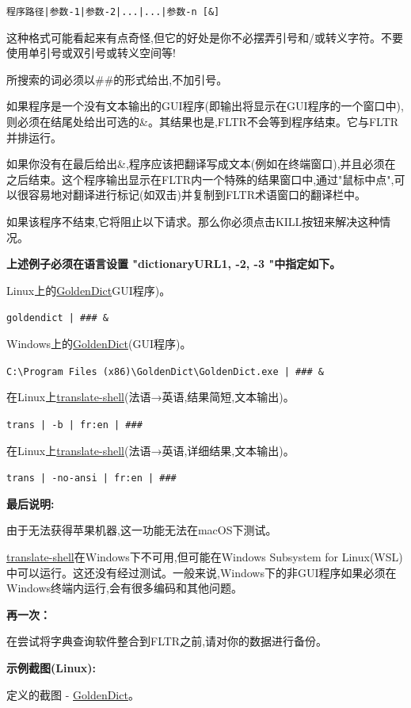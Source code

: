 \documentclass[cn,10pt,math=newtx,citestyle=gb7714-2015,bibstyle=gb7714-2015]{elegantbook}
\newcommand{\goldendict}{\href{http://goldendict.org/}{GoldenDict}}
\newcommand{\translateshell}{\href{https://github.com/soimort/translate-shell}{translate-shell}}
\begin{document}
\lstinline{程序路径|参数-1|参数-2|...|...|参数-n [&]}



这种格式可能看起来有点奇怪,但它的好处是你不必摆弄引号和/或转义字符。不要使用单引号或双引号或转义空间等!

所搜索的词必须以\#\#的形式给出,不加引号。

如果程序是一个没有文本输出的GUI程序(即输出将显示在GUI程序的一个窗口中),则必须在结尾处给出可选的\&。其结果也是,FLTR不会等到程序结束。它与FLTR并排运行。

如果你没有在最后给出\&,程序应该把翻译写成文本(例如在终端窗口),并且必须在之后结束。这个程序输出显示在FLTR内一个特殊的结果窗口中,通过"鼠标中点",可以很容易地对翻译进行标记(如双击)并复制到FLTR术语窗口的翻译栏中。

如果该程序不结束,它将阻止以下请求。那么你必须点击KILL按钮来解决这种情况。


\textbf{上述例子必须在语言设置 "dictionaryURL1, -2, -3 "中指定如下。}

Linux上的\goldendict GUI程序)。

\lstinline{goldendict | ### &}

Windows上的\goldendict (GUI程序)。

\lstinline{C:\Program Files (x86)\GoldenDict\GoldenDict.exe | ### &}

在Linux上\translateshell(法语→英语,结果简短,文本输出)。

\lstinline{trans | -b | fr:en | ###}

在Linux上\translateshell(法语→英语,详细结果,文本输出)。

\lstinline{trans | -no-ansi | fr:en | ###}

\textbf{最后说明:}

由于无法获得苹果机器,这一功能无法在macOS下测试。

\translateshell 在Windows下不可用,但可能在Windows Subsystem for Linux(WSL)中可以运行。这还没有经过测试。一般来说,Windows下的非GUI程序如果必须在Windows终端内运行,会有很多编码和其他问题。

\textbf{再一次：}


在尝试将字典查询软件整合到FLTR之前,请对你的数据进行备份。


\textbf{示例截图(Linux):}

定义的截图 - \goldendict 。
\end{document}
